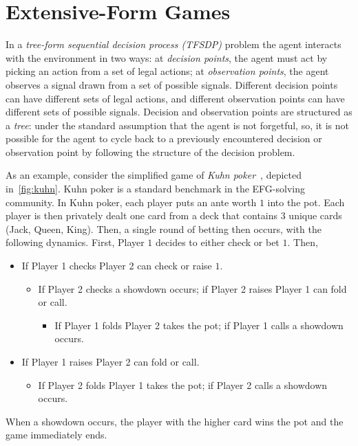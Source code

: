 \section{Extensive-Form Games}
\label{app:efgs}


In a \emph{tree-form sequential decision process (TFSDP)} problem the agent
interacts with the environment in two ways: at \emph{decision points}, the
agent must act by picking an action from a set of legal actions; at
\emph{observation points}, the agent observes a signal drawn from a set of
possible signals.
Different decision points can have different sets of legal actions, and
different observation points can have different sets of possible signals.
Decision and observation points are structured as a \emph{tree}: under the standard assumption that
the agent
is not forgetful, so, it is not possible for the agent to cycle back to a
previously encountered decision or observation point by following the
structure of the decision problem.

As an example, consider the
simplified game of \emph{Kuhn poker}~\citep{Kuhn50:Simplified}, depicted
in~\cref{fig:kuhn}. Kuhn poker is a standard benchmark in the EFG-solving community.
In Kuhn poker, each player puts an ante worth $1$ into the pot. Each player is then privately dealt one card from a deck that contains $3$ unique cards (Jack, Queen, King). Then, a single round of betting then occurs, with the following dynamics. First, Player $1$ decides to either check or bet $1$. Then,
\begin{itemize}[nolistsep]
    \item If Player 1 checks Player 2 can check or raise $1$.
          \begin{itemize}[nolistsep]
              \item If Player 2 checks a showdown occurs; if Player 2 raises Player 1 can fold or call.
                    \begin{itemize}
                        \item If Player 1 folds Player 2 takes the pot; if Player 1 calls a showdown occurs.
                    \end{itemize}
          \end{itemize}
    \item If Player 1 raises Player 2 can fold or call.
          \begin{itemize}[nolistsep]
              \item If Player 2 folds Player 1 takes the pot; if Player 2 calls a showdown occurs.
          \end{itemize}
\end{itemize}
When a showdown occurs, the player with the higher card wins the pot and the game immediately ends.

